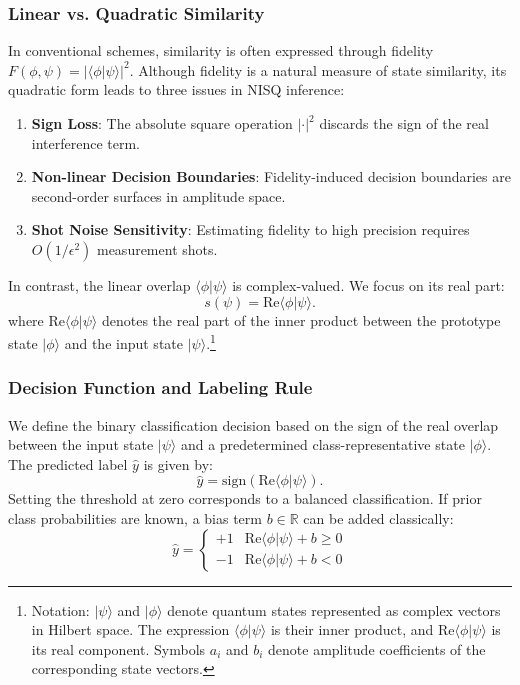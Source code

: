 \documentclass[conference]{IEEEtran}
\begin{document}
\subsubsection{Linear vs. Quadratic Similarity}
In conventional schemes, similarity is often expressed through fidelity $F(\phi, \psi) = |\langle \phi | \psi \rangle|^2$. Although fidelity is a natural measure of state similarity, its quadratic form leads to three issues in NISQ inference:
\begin{enumerate}
    \item \textbf{Sign Loss}: The absolute square operation $|\cdot|^2$ discards the sign of the real interference term.
    \item \textbf{Non-linear Decision Boundaries}: Fidelity-induced decision boundaries are second-order surfaces in amplitude space.
    \item \textbf{Shot Noise Sensitivity}: Estimating fidelity to high precision requires $O(1/\epsilon^2)$ measurement shots.
\end{enumerate}

In contrast, the linear overlap $\langle \phi | \psi \rangle$ is complex-valued. We focus on its real part:
\begin{equation}
s(\psi) = \mathrm{Re}\langle \phi | \psi \rangle.
\end{equation}
where $\mathrm{Re}\langle \phi | \psi \rangle$ denotes the real part of the inner product between the prototype state $|\phi\rangle$ and the input state $|\psi\rangle$.\footnote{Notation: $|\psi\rangle$ and $|\phi\rangle$ denote quantum states represented as complex vectors in Hilbert space. The expression $\langle \phi | \psi \rangle$ is their inner product, and $\mathrm{Re}\langle \phi | \psi \rangle$ is its real component. Symbols $a_i$ and $b_i$ denote amplitude coefficients of the corresponding state vectors.}

\subsubsection{Decision Function and Labeling Rule}
We define the binary classification decision based on the sign of the real overlap between the input state $|\psi\rangle$ and a predetermined class-representative state $|\phi\rangle$. The predicted label $\hat{y}$ is given by:
\begin{equation}
\hat{y} = \text{sign}\left( \mathrm{Re}\langle \phi | \psi \rangle \right).
\end{equation}
Setting the threshold at zero corresponds to a balanced classification. If prior class probabilities are known, a bias term $b \in \mathbb{R}$ can be added classically:
\begin{equation}
\hat{y} = \begin{cases} +1 & \mathrm{Re}\langle \phi | \psi \rangle + b \geq 0 \\ -1 & \mathrm{Re}\langle \phi | \psi \rangle + b < 0 \end{cases}
\end{equation}
\end{document}
